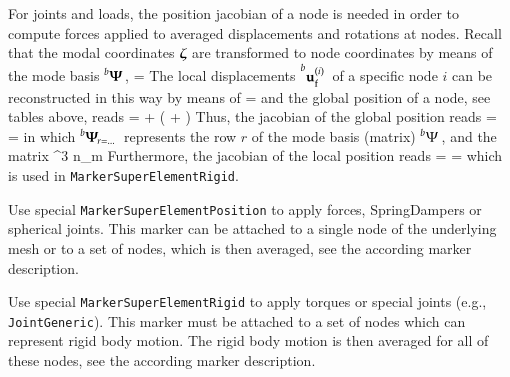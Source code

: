     For joints and loads, the position jacobian of a node is needed in order to compute forces applied to averaged displacements and 
    rotations at nodes.
    Recall that the modal coordinates $\mbox{\boldmath $\zeta$ \unboldmath}\!\!$ are transformed to node coordinates by means of the mode basis  $\prescript{b}{}{\mbox{\boldmath $\Psi$ \unboldmath}\!\!}\,$,
    \be
       =  \tzeta \eqDot
    \ee
    The local displacements $\prescript{b}{}{\mathbf{u}_\mathrm{f}^{(i)}}\,$ of a specific node $i$ can be reconstructed in this way by means of
    \be
       =  \eqComma
    \ee
    and the global position of a node, see tables above, reads
    \be
       =  +  \left(  +  \right)
    \ee
    Thus, the jacobian of the global position reads
    \be
      = 
     = \left[\Im, \; -\LU{0b}{\Rot} \left(\LU{b}{\tilde\uv\indf^{(i)}} + \LU{b}{\tilde\xv^{(i)}\cRef} \right) \LU{b}{\Gm},\;
             \LU{0b}{\Rot} \vr{\LU{b}{\tPsi_{r=3i}\tp}}{\LU{b}{\tPsi_{r=3i+1}\tp}}{\LU{b}{\tPsi_{r=3i+2}\tp}}\right] \eqComma
    \ee
    in which $\prescript{b}{}{\mbox{\boldmath $\Psi$ \unboldmath}\!\!_{r=...}}\,$ represents the row $r$ of the mode basis (matrix) $\prescript{b}{}{\Psi}\,$, and
    the matrix 
    \be
       \in \Rcal^{3 \times n_m}
    \ee
    Furthermore, the jacobian of the local position reads
    \be
      = 
     = \left[\Null, \; \Null, \; \vr{\LU{b}{\tPsi_{r=3i}\tp}}{\LU{b}{\tPsi_{r=3i+1}\tp}}{\LU{b}{\tPsi_{r=3i+2}\tp}}\right] \eqComma
    \ee
    which is used in \texttt{MarkerSuperElementRigid}.
    
    
    Use special \texttt{MarkerSuperElementPosition} to apply forces, SpringDampers or spherical joints. This marker can be attached to a single node of the underlying
    mesh or to a set of nodes, which is then averaged, see the according marker description.
    
    Use special \texttt{MarkerSuperElementRigid} to apply torques or special joints (e.g., \texttt{JointGeneric}). 
    This marker must be attached to a set of nodes which can represent rigid body motion. The rigid body motion is then averaged for all of these nodes,
    see the according marker description.
    
